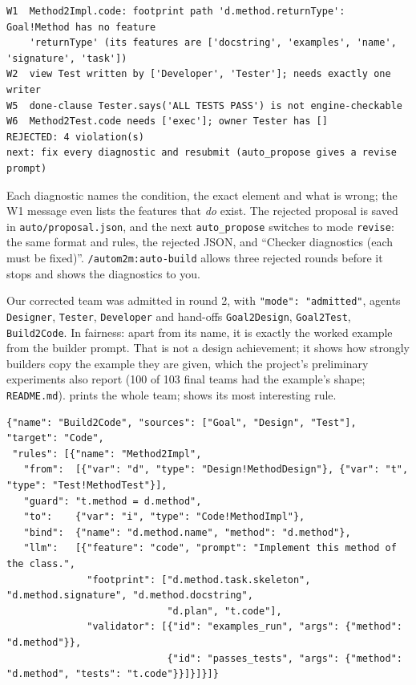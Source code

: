 \documentclass[10pt,a4paper]{article}
\newcommand{\W}[1]{\textsf{W#1}}
\newcommand{\code}[1]{\texttt{#1}}
\newcommand{\file}[1]{\texttt{#1}}
\newcommand{\mcptool}[1]{\texttt{#1}}
\newcommand{\skill}[1]{\texttt{/autom2m:#1}}
\begin{document}
\begin{lstlisting}[style=engine, caption={Observed: \code{auto\_submit\_team} on the first proposal.}, label={lst:w2reject}]
W1  Method2Impl.code: footprint path 'd.method.returnType': Goal!Method has no feature
    'returnType' (its features are ['docstring', 'examples', 'name', 'signature', 'task'])
W2  view Test written by ['Developer', 'Tester']; needs exactly one writer
W5  done-clause Tester.says('ALL TESTS PASS') is not engine-checkable
W6  Method2Test.code needs ['exec']; owner Tester has []
REJECTED: 4 violation(s)
next: fix every diagnostic and resubmit (auto_propose gives a revise prompt)
\end{lstlisting}

Each diagnostic names the condition, the exact element and what is wrong;
the \W{1} message even lists the features that \emph{do} exist. The rejected
proposal is saved in \file{auto/proposal.json}, and the next
\mcptool{auto\_propose} switches to mode \code{revise}: the same format and
rules, the rejected JSON, and ``Checker diagnostics (each must be fixed)''.
\skill{auto-build} allows three rejected rounds before it stops and shows the
diagnostics to you.

Our corrected team was admitted in round 2, with \code{"mode": "admitted"},
agents \code{Designer}, \code{Tester}, \code{Developer} and hand-offs
\code{Goal2Design}, \code{Goal2Test}, \code{Build2Code}. In fairness: apart
from its name, it is exactly the worked example from the builder prompt.
That is not a design achievement; it shows how strongly builders copy the
example they are given, which the project's preliminary experiments also
report (100 of 103 final teams had the example's shape; \file{README.md}).  prints the whole team;
 shows its most interesting rule.

\begin{lstlisting}[style=model, caption={Code excerpt: the rule that writes the deliverable (from \Cref{app:team}).}, label={lst:w2team}]
{"name": "Build2Code", "sources": ["Goal", "Design", "Test"], "target": "Code",
 "rules": [{"name": "Method2Impl",
   "from":  [{"var": "d", "type": "Design!MethodDesign"}, {"var": "t", "type": "Test!MethodTest"}],
   "guard": "t.method = d.method",
   "to":    {"var": "i", "type": "Code!MethodImpl"},
   "bind":  {"name": "d.method.name", "method": "d.method"},
   "llm":   [{"feature": "code", "prompt": "Implement this method of the class.",
              "footprint": ["d.method.task.skeleton", "d.method.signature", "d.method.docstring",
                            "d.plan", "t.code"],
              "validator": [{"id": "examples_run", "args": {"method": "d.method"}},
                            {"id": "passes_tests", "args": {"method": "d.method", "tests": "t.code"}}]}]}]}
\end{lstlisting}
\end{document}
